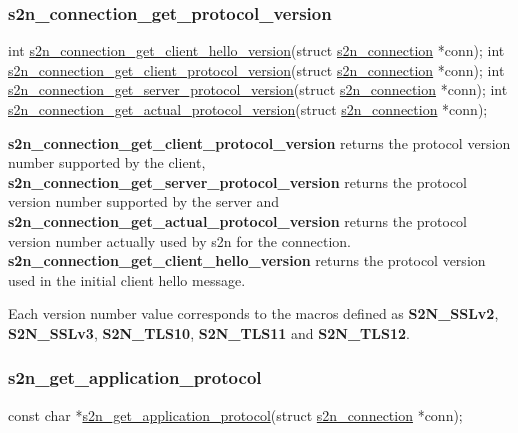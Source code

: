 \subsubsection*{s2n\+\_\+connection\+\_\+get\+\_\+protocol\+\_\+version}


\begin{DoxyCode}
\textcolor{keywordtype}{int} \hyperlink{s2n_8h_a3d4e8c095c40ea7689f14022567cd3e9}{s2n\_connection\_get\_client\_hello\_version}(\textcolor{keyword}{struct} 
      \hyperlink{structs2n__connection}{s2n\_connection} *conn);
\textcolor{keywordtype}{int} \hyperlink{s2n_8h_af15303e1d72a95320b6138edeef7a6ab}{s2n\_connection\_get\_client\_protocol\_version}(\textcolor{keyword}{struct} 
      \hyperlink{structs2n__connection}{s2n\_connection} *conn);
\textcolor{keywordtype}{int} \hyperlink{s2n_8h_ae2ea6a2e6468883f56459431f2024b0f}{s2n\_connection\_get\_server\_protocol\_version}(\textcolor{keyword}{struct} 
      \hyperlink{structs2n__connection}{s2n\_connection} *conn);
\textcolor{keywordtype}{int} \hyperlink{s2n_8h_a4cb9df94e1fe137f10040fbfc1ad98f9}{s2n\_connection\_get\_actual\_protocol\_version}(\textcolor{keyword}{struct} 
      \hyperlink{structs2n__connection}{s2n\_connection} *conn);
\end{DoxyCode}


{\bfseries s2n\+\_\+connection\+\_\+get\+\_\+client\+\_\+protocol\+\_\+version} returns the protocol version number supported by the client, {\bfseries s2n\+\_\+connection\+\_\+get\+\_\+server\+\_\+protocol\+\_\+version} returns the protocol version number supported by the server and {\bfseries s2n\+\_\+connection\+\_\+get\+\_\+actual\+\_\+protocol\+\_\+version} returns the protocol version number actually used by s2n for the connection. {\bfseries s2n\+\_\+connection\+\_\+get\+\_\+client\+\_\+hello\+\_\+version} returns the protocol version used in the initial client hello message.

Each version number value corresponds to the macros defined as {\bfseries S2\+N\+\_\+\+S\+S\+Lv2}, {\bfseries S2\+N\+\_\+\+S\+S\+Lv3}, {\bfseries S2\+N\+\_\+\+T\+L\+S10}, {\bfseries S2\+N\+\_\+\+T\+L\+S11} and {\bfseries S2\+N\+\_\+\+T\+L\+S12}.

\subsubsection*{s2n\+\_\+get\+\_\+application\+\_\+protocol}


\begin{DoxyCode}
\textcolor{keyword}{const} \textcolor{keywordtype}{char} *\hyperlink{s2n_8h_a5a0e7b4549f38de84e325e221b596908}{s2n\_get\_application\_protocol}(\textcolor{keyword}{struct} 
      \hyperlink{structs2n__connection}{s2n\_connection} *conn);
\end{DoxyCode}


